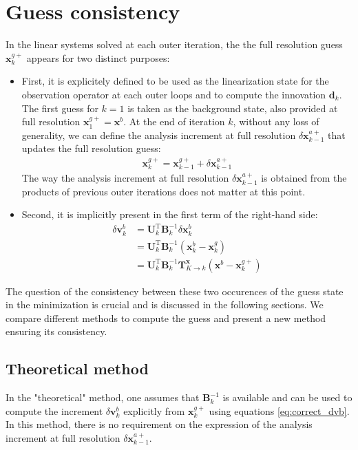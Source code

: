 \documentclass[npg, manuscript]{copernicus}
\begin{document}
\section{Guess consistency}
In the linear systems solved at each outer iteration, the the full resolution guess $\mathbf{x}^{g+}_k$ appears for two distinct purposes:
\begin{itemize}
\item First, it is explicitely defined to be used as the linearization state for the observation operator at each outer loops and to compute the innovation $\mathbf{d}_k$. The first guess for $k=1$ is taken as the background state, also provided at full resolution $\mathbf{x}^{g+}_1 = \mathbf{x}^b$. At the end of iteration $k$, without any loss of generality, we can define the analysis increment at full resolution $\delta \mathbf{x}^{a+}_{k-1}$ that updates the full resolution guess:
\begin{align}
\label{eq:usual_full_res_next}
\mathbf{x}^{g+}_k = \mathbf{x}^{g+}_{k-1} + \delta \mathbf{x}^{a+}_{k-1}
\end{align}
The way the analysis increment at full resolution $\delta \mathbf{x}^{a+}_{k-1}$ is obtained from the products of previous outer iterations does not matter at this point.

\item Second, it is implicitly present in the first term of the right-hand side:
\begin{align}
\label{eq:correct_dvb}
\delta \mathbf{v}^b_k & = \mathbf{U}_k^\mathrm{T} \mathbf{B}^{-1}_k \delta \mathbf{x}^b_k \nonumber \\
& = \mathbf{U}_k^\mathrm{T} \mathbf{B}^{-1}_k \left(\mathbf{x}^b_k - \mathbf{x}^g_k\right)  \nonumber \\
& = \mathbf{U}_k^\mathrm{T} \mathbf{B}^{-1}_k \mathbf{T}^\mathbf{x}_{K \rightarrow k} \left(\mathbf{x}^b - \mathbf{x}^{g+}_k\right)
\end{align}
\end{itemize}
The question of the consistency between these two occurences of the guess state in the minimization is crucial and is discussed in the following sections. We compare different methods to compute the guess and present a new method ensuring its consistency.

\subsection{Theoretical method}
In the "theoretical" method, one assumes that $\mathbf{B}_k^{-1}$ is available and can be used to compute the increment $\delta \mathbf{v}^b_k$ explicitly from $\mathbf{x}^{g+}_k$ using equations \eqref{eq:correct_dvb}. In this method, there is no requirement on the expression of the analysis increment at full resolution $\delta \mathbf{x}^{a+}_{k-1}$.
\end{document}
